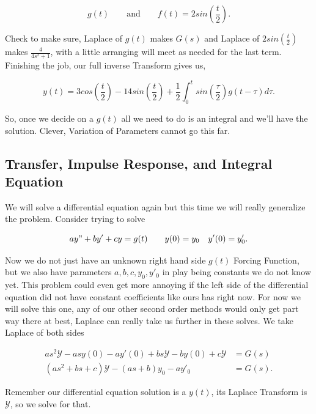\documentclass[12pt]{article}
\newcommand{\hugey}{\mathscr{Y}}
\begin{document}
\begin{equation*}
    g(t) \qquad \text{and} \qquad f(t)=2sin\left(\frac{t}{2}\right).
\end{equation*}

Check to make sure, Laplace of $g(t)$ makes $G(s)$ and Laplace of $2sin\left(\frac{t}{2}\right)$ makes $\frac{4}{4s^2+1}$, with a little arranging will meet as needed for the last term. Finishing the job, our full inverse Transform gives us,

\begin{equation*}
    y(t)=3cos\left(\frac{t}{2}\right)-14sin\left(\frac{t}{2}\right)+\frac{1}{2}\int_{0}^{t}sin\left(\frac{\tau}{2}\right)g(t-\tau) d\tau.
\end{equation*}

So, once we decide on a $g(t)$ all we need to do is an integral and we'll have the solution. Clever, Variation of Parameters cannot go this far.

\subsection{Transfer, Impulse Response, and Integral Equation}

We will solve a differential equation again but this time we will really generalize the problem. Consider trying to solve

\begin{equation*}
    ay"+by'+cy=g(t) \qquad y(0)=y_0 \quad y'(0)=y'_0.
\end{equation*}

Now we do not just have an unknown right hand side $g(t)$ Forcing Function, but we also have parameters $a,b,c,y_0,y'_0$ in play being constants we do not know yet. This problem could even get more annoying if the left side of the differential equation did not have constant coefficients like ours has right now. For now we will solve this one, any of our other second order methods would only get part way there at best, Laplace can really take us further in these solves. We take Laplace of both sides

\begin{align*}
    as^2\hugey-asy(0)-ay'(0)+bs\hugey-by(0)+c\hugey &= G(s) \\
    (as^2+bs+c)\hugey - (as+b)y_0 - ay'_0 &= G(s).
\end{align*}

Remember our differential equation solution is a $y(t)$, its Laplace Transform is $\hugey$, so we solve for that.
\end{document}
